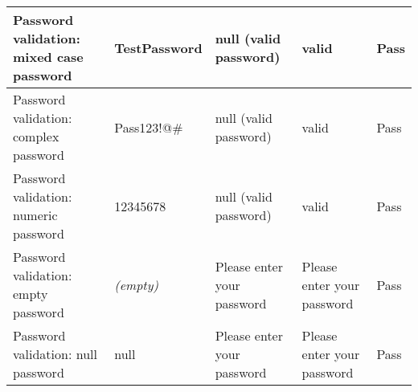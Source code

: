 \begin{table*}[t]
\begin{tabular}{|p{5cm}|p{2.5cm}|p{3cm}|p{3cm}|p{1cm}|}
Password validation: mixed case password & TestPassword & null (valid password) & valid & Pass \\ \hline
Password validation: complex password & Pass123!@# & null (valid password) & valid & Pass \\ \hline
Password validation: numeric password & 12345678 & null (valid password) & valid & Pass \\ \hline
Password validation: empty password & \textit{(empty)} & Please enter your password & Please enter your password & Pass \\ \hline
Password validation: null password & null & Please enter your password & Please enter your password & Pass \\ \hline
\end{tabular}
\end{table*}
